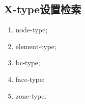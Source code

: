 \documentclass[lang=cn,11pt,a4paper]{elegantpaper}
\begin{document}
\subsection{X-type设置检索}
\begin{enumerate}
  \item node-type;
  \item element-type;
  \item bc-type;
  \item face-type;
  \item zone-type.
\end{enumerate}
\end{document}

